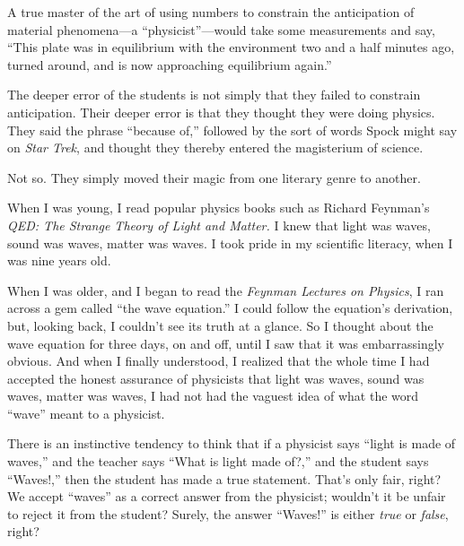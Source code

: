 {
 A true master of the art of using numbers to constrain the
anticipation of material phenomena---a
``physicist''---would take some
measurements and say, ``This plate was in equilibrium
with the environment two and a half minutes ago, turned around, and is
now approaching equilibrium again.''}

{
 The deeper error of the students is not simply that they failed to
constrain anticipation. Their deeper error is that they thought they
were doing physics. They said the phrase ``because
of,'' followed by the sort of words Spock might say
on \textit{Star Trek}, and thought they thereby entered the magisterium
of science.}

{
 Not so. They simply moved their magic from one literary genre to
another.}

\myendsectiontext


\bigskip


{
 When I was young, I read popular physics books such as Richard
Feynman's \textit{QED: The Strange Theory of Light and
Matter.} I knew that light was waves, sound was waves, matter was
waves. I took pride in my scientific literacy, when I was nine years
old. }

{
 When I was older, and I began to read the \textit{Feynman Lectures
on Physics}, I ran across a gem called ``the wave
equation.'' I could follow the
equation's derivation, but, looking back, I
couldn't see its truth at a glance. So I thought about
the wave equation for three days, on and off, until I saw that it was
embarrassingly obvious. And when I finally understood, I realized that
the whole time I had accepted the honest assurance of physicists that
light was waves, sound was waves, matter was waves, I had not had the
vaguest idea of what the word
``wave'' meant to a physicist.}

{
 There is an instinctive tendency to think that if a physicist says
``light is made of waves,'' and the
teacher says ``What is light made
of?,'' and the student says
``Waves!,'' then the student has
made a true statement. That's only fair, right? We
accept ``waves'' as a correct answer
from the physicist; wouldn't it be unfair to reject it
from the student? Surely, the answer
``Waves!'' is either \textit{true}
or \textit{false}, right?}

